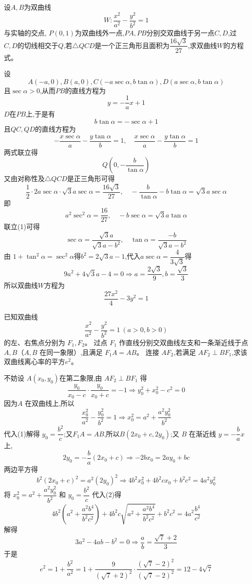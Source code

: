 \begin{questions}
    \question 设$A,B$为双曲线
    \[
    W: \frac{x^{2}}{a^{2}}-\frac{y^{2}}{b^{2}}=1
    \]
    与实轴的交点, $P(0,1)$为双曲线外一点,$PA,PB$分别交双曲线于另一点$C,D$,过$C,D$的切线相交于$Q$,若$\triangle QCD$是一个正三角形且面积为$\dfrac{16\sqrt{3}}{27}$,求双曲线$W$的方程式。
    \begin{solution}
        设
        \[
        A(-a,0),B(a,0),C(-a \sec \alpha,b \tan \alpha),D(a \sec \alpha,b \tan \alpha)
        \]
        且$\sec \alpha > 0$,从而$PB$的直线方程为
        \[
        y=-\frac{1}{a}x+1
        \] 
        $D$在$PB$上,于是有
        \[
        b\tan \alpha=-\sec \alpha+1 \tag{1}
        \]
        且$QC,QD$的直线方程为
        \[
        -\frac{x \sec \alpha}{a}-\frac{y \tan \alpha}{b}=1,\quad \frac{x \sec \alpha}{a}-\frac{y \tan \alpha}{b}=1
        \]
        两式联立得
        \[
        Q\left(0,-\dfrac{b}{\tan \alpha}\right)
        \]
        又由对称性及$\triangle QCD$是正三角形可得
        \[
        \frac{1}{2}\cdot2a \sec \alpha\cdot\sqrt{3}a \sec \alpha=\frac{16\sqrt{3}}{27},\quad -\frac{b}{\tan \alpha}-b \tan \alpha=\sqrt{3}a \sec \alpha
        \]
        即
        \[
        a^{2}\sec^{2}\alpha=\frac{16}{27},\quad -b \sec \alpha=\sqrt{3}a \tan \alpha
        \]
        联立(1)可得 
        \[
        \sec \alpha=\frac{\sqrt{3}a}{\sqrt{3}a-b^{2}},\quad \tan \alpha=\frac{-b}{\sqrt{3}a-b^{2}}
        \]
        由 $1+\tan^{2}\alpha=\sec^{2}\alpha$得$b^{2}=2\sqrt{3}a-1$,代入$a \sec \alpha=\dfrac{4}{3\sqrt{3}}$得
        \[
        9a^{2}+4\sqrt{3}a-4=0\Rightarrow a=\frac{2\sqrt{3}}{9}, b=\frac{\sqrt{3}}{3}
        \]
        所以双曲线$W$方程为
        \[
        \frac{27x^{2}}{4}-3y^{2}=1
        \]
    \end{solution}

    \question 已知双曲线 
    \[
    \frac{x^2}{a^2}-\frac{y^2}{b^2}=1\ (a>0,b>0)
    \]
    的左、右焦点分别为 $F_1, F_2$。  
    过点 $F_1$ 作直线分别交双曲线左支和一条渐近线于点 $A,B$（$A,B$ 在同一象限）,且满足 $F_1A = AB$。  
    连接 $AF_2$,若满足 $AF_2 \perp BF_1$,求该双曲线离心率的平方$e^2$。
    \begin{solution}
        不妨设 $A(x_0,y_0)$在第二象限,由 $AF_2\perp BF_1$ 得 
        \[
        \frac{y_0}{x_0-c}\cdot\frac{y_0}{x_0+c}=-1 \Rightarrow y_0^2+x_0^2-c^2=0 \tag{1}
        \]
        因为$A$ 在双曲线上,所以 
        \[
        \frac{x_0^2}{a^2}-\frac{y_0^2}{b^2}=1 \Rightarrow
        x_0^2=a^2+\frac{a^2y_0^2}{b^2}
        \]
        代入(1)解得 $y_0=\dfrac{b^2}{c}$;又$ F_1A=AB$,所以$ B(2x_0+c,2y_0)$;又 $B$ 在渐近线 $y=-\dfrac{b}{a}x$ 上,
        \[
        2y_0=-\frac{b}{a}(2x_0+c) \Rightarrow -2bx_0=2ay_0+bc
        \] 
        两边平方得 
        \[
        b^2(2x_0+c)^2=a^2(2y_0)^2 \Rightarrow 4b^2x_0^2+4b^2cx_0+b^2c^2=4a^2y_0^2 \tag{2}
        \]
        将 $x_0^2=a^2+\dfrac{a^2y_0^2}{b^2}$ 和 $y_0=\dfrac{b^2}{c}$ 代入(2)得 
        \[
        4b^2(a^2+\frac{a^2b^4}{b^2c^2})+4b^2c\sqrt{a^2+\frac{a^2b^4}{b^2c^2}}+b^2c^2=4a^2\frac{b^4}{c^2} 
        \]
        解得 
        \[
        3a^2-4ab-b^2=0\Rightarrow \frac{a}{b}=\frac{\sqrt{7}+2}{3} 
        \]
        于是
        \[
        e^2=1+\frac{b^2}{a^2}=1+\frac{9}{(\sqrt{7}+2)^2}\cdot\frac{(\sqrt7-2)^2}{(\sqrt7-2)^2}=12-4\sqrt{7}
        \] 
    \end{solution}


\end{questions}
